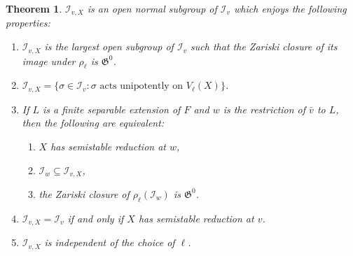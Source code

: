 \documentclass{amsart}
\def\I{{\mathcal I}}
\def\II{{{\mathcal I}_{v,X}}}
\def\r{{\mathfrak G}}
\newtheorem{thm}{Theorem}[section]
\theoremstyle{definition}
\begin{document}
\begin{thm}
\label{main}
$\II$ is an open normal subgroup of $\I_{v}$ 
which enjoys the following properties:
\begin{enumerate}
\item[(i)] $\II$ is the largest open
subgroup of $\I_{v}$ such that the Zariski closure of its
image under $\rho_{\ell}$ is $\r^{0}$.
\item[(ii)] $\II = 
\{\sigma \in \I_{v} : 
\sigma \text{ acts unipotently on } V_{\ell}(X) \}$.
\item[(iii)] If $L$ is a finite separable extension of $F$
and $w$ is the restriction of ${\bar v}$ to $L$, then the
following are equivalent:
\begin{enumerate}
\item[(a)] $X$ has semistable reduction at $w$,
\item[(b)] $\I_{w} \subseteq \II$,
\item[(c)] 
the Zariski closure of $\rho_{\ell}(\I_{w})$ is $\r^{0}$.
\end{enumerate} 
\item[(iv)] $\II = \I_{v}$ if and only if $X$ has semistable
reduction at $v$.
\item[(v)] $\II$ is independent of the choice of $\ell$.
\end{enumerate} 
\end{thm}
\end{document}
